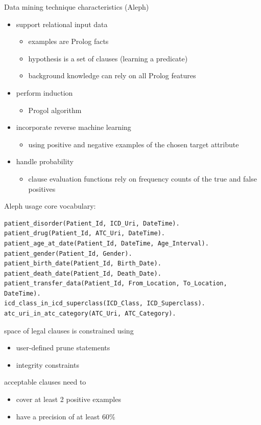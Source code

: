 \message{ !name(presentation.tex)}\documentclass{beamer}
\begin{document}
\begin{frame}{Data mining technique characteristics (Aleph)}
  \begin{itemize}
  \item support relational input data \pause 
    \begin{itemize}
      \item examples are Prolog facts
      \item hypothesis is a set of clauses (learning a predicate)
      \item background knowledge can rely on all Prolog features \pause
    \end{itemize} 
  \item perform induction \pause
    \begin{itemize}
    \item Progol algorithm \pause
    \end{itemize}
  \item incorporate reverse machine learning \pause
    \begin{itemize}
      \item using positive and negative examples of the chosen target attribute \pause
    \end{itemize}
  \item handle probability \pause
    \begin{itemize}
      \item clause evaluation functions rely on frequency counts of the true and false positives
    \end{itemize}

  \end{itemize}
\end{frame}

\begin{frame}[fragile]{Aleph usage}
core vocabulary:
{\tiny
\begin{verbatim}
patient_disorder(Patient_Id, ICD_Uri, DateTime).
patient_drug(Patient_Id, ATC_Uri, DateTime).
patient_age_at_date(Patient_Id, DateTime, Age_Interval).
patient_gender(Patient_Id, Gender).
patient_birth_date(Patient_Id, Birth_Date).
patient_death_date(Patient_Id, Death_Date).
patient_transfer_data(Patient_Id, From_Location, To_Location, DateTime).
icd_class_in_icd_superclass(ICD_Class, ICD_Superclass).
atc_uri_in_atc_category(ATC_Uri, ATC_Category).
\end{verbatim}
}
space of legal clauses is constrained using 
\begin{itemize}
\item user-defined prune statements
\item integrity constraints
\end{itemize}
acceptable clauses need to
\begin{itemize}
  \item cover at least 2 positive examples
  \item have a precision of at least 60\%
\end{itemize}
\end{frame}
\end{document}
